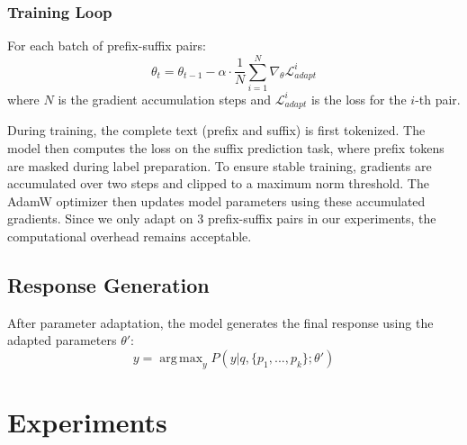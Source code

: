 \documentclass{article}
\DeclareMathOperator*{\argmax}{arg\,max}
\begin{document}
\subsubsection{Training Loop}
For each batch of prefix-suffix pairs:
\begin{equation}
    \theta_t = \theta_{t-1} - \alpha \cdot \frac{1}{N} \sum_{i=1}^N \nabla_\theta \mathcal{L}_{adapt}^i
\end{equation}
where $N$ is the gradient accumulation steps and $\mathcal{L}_{adapt}^i$ is the loss for the $i$-th pair.

During training, the complete text (prefix and suffix) is first tokenized. The model then computes the loss on the suffix prediction task, where prefix tokens are masked during label preparation. To ensure stable training, gradients are accumulated over two steps and clipped to a maximum norm threshold. The AdamW optimizer then updates model parameters using these accumulated gradients. Since we only adapt on 3 prefix-suffix pairs in our experiments, the computational overhead remains acceptable.



\subsection{Response Generation}
After parameter adaptation, the model generates the final response using the adapted parameters $\theta'$:
\begin{equation}
    y = \argmax_y P(y|q, \{p_1, ..., p_k\}; \theta')
\end{equation}


\section{Experiments}
\end{document}
